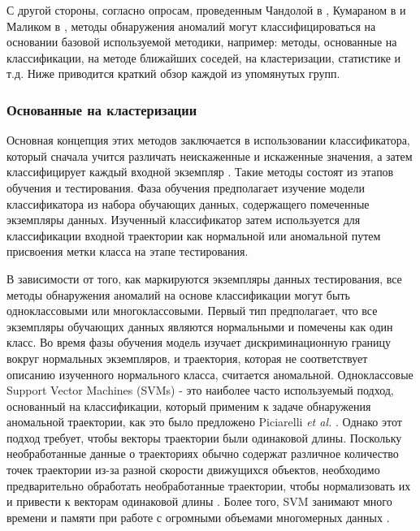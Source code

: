 С другой стороны, согласно опросам, проведенным Чандолой в \cite{article:15_survey_ad}, Кумараном в \cite{article:6_survey_anom_det_rtuvs} и Маликом в \cite{article:comp_analys_odt}, методы обнаружения аномалий могут классифицироваться на основании базовой используемой методики, например: методы, основанные на классификации, на методе ближайших соседей, на кластеризации, статистике и т.д. Ниже приводится краткий обзор каждой из упомянутых групп.

\subsubsection{Основанные на кластеризации}

Основная концепция этих методов заключается в использовании классификатора, который сначала учится различать неискаженные и искаженные значения, а затем классифицирует каждый входной экземпляр \cite{inproceedings:18_ardod_lstd}. Такие методы состоят из этапов обучения и тестирования. Фаза обучения предполагает изучение модели классификатора из набора обучающих данных, содержащего помеченные экземпляры данных. Изученный классификатор затем используется для классификации входной траектории как нормальной или аномальной путем присвоения метки класса на этапе тестирования.

В зависимости от того, как маркируются экземпляры данных тестирования, все методы обнаружения аномалий на основе классификации могут быть одноклассовыми или многоклассовыми. Первый тип предполагает, что все экземпляры обучающих данных являются нормальными и помечены как один класс. Во время фазы обучения модель изучает дискриминационную границу вокруг нормальных экземпляров, и траектория, которая не соответствует описанию изученного нормального класса, считается аномальной. Одноклассовые Support Vector Machines (SVMs) - это наиболее часто используемый подход, основанный на классификации, который применим к задаче обнаружения аномальной траектории, как это было предложено Piciarelli \textit{et al.} \cite{inproceedings:16_va_tad_svm} \cite{article:17_tbaed}. Однако этот подход требует, чтобы векторы траектории были одинаковой длины. Поскольку необработанные данные о траекториях обычно содержат различное количество точек траектории из-за разной скорости движущихся объектов, необходимо предварительно обработать необработанные траектории, чтобы нормализовать их и привести к векторам одинаковой длины \cite{article:17_tbaed}. Более того, SVM занимают много времени и памяти при работе с огромными объемами многомерных данных \cite{article:22_survey_dscc}.

